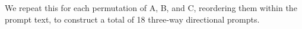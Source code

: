We repeat this for each permutation of A, B, and C, reordering them within the prompt text, to construct a total of 18 three-way directional prompts.















        






